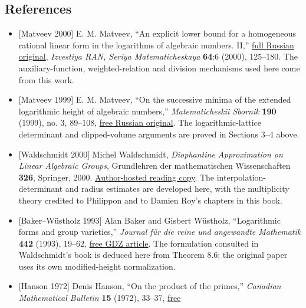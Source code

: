 \documentclass[
  11pt,
  a4paper,
]{article}
\providecommand{\tightlist}{%
  \setlength{\itemsep}{0pt}\setlength{\parskip}{0pt}}
\begin{document}
\subsection{References}\label{references}

\begin{itemize}
\tightlist
\item
  {[}Matveev 2000{]} E. M. Matveev, ``An explicit lower bound for a
  homogeneous rational linear form in the logarithms of algebraic
  numbers. II,''
  \href{https://m.mathnet.ru/php/getFT.phtml?jrnid=im&paperid=314&what=fullt&option_lang=rus}{full
  Russian original}, \emph{Izvestiya RAN, Seriya Matematicheskaya}
  \textbf{64}:6 (2000), 125--180. The auxiliary-function,
  weighted-relation and division mechanisms used here come from this
  work.
\item
  {[}Matveev 1999{]} E. M. Matveev, ``On the successive minima of the
  extended logarithmic height of algebraic numbers,''
  \emph{Matematicheskii Sbornik} \textbf{190} (1999), no. 3, 89--108,
  \href{https://m.mathnet.ru/php/getFT.phtml?jrnid=sm&option_lang=rus&paperid=394&what=fullt}{free
  Russian original}. The logarithmic-lattice determinant and
  clipped-volume arguments are proved in Sections 3--4 above.
\item
  {[}Waldschmidt 2000{]} Michel Waldschmidt, \emph{Diophantine
  Approximation on Linear Algebraic Groups}, Grundlehren der
  mathematischen Wissenschaften \textbf{326}, Springer, 2000.
  \href{https://webusers.imj-prg.fr/~michel.waldschmidt/articles/pdf/dalag.pdf}{Author-hosted
  reading copy}. The interpolation-determinant and radius estimates are
  developed here, with the multiplicity theory credited to Philippon and
  to Damien Roy's chapters in this book.
\item
  {[}Baker--Wüstholz 1993{]} Alan Baker and Gisbert Wüstholz,
  ``Logarithmic forms and group varieties,'' \emph{Journal für die reine
  und angewandte Mathematik} \textbf{442} (1993), 19--62,
  \href{https://gdz.sub.uni-goettingen.de/download/pdf/PPN243919689_0442/LOG_0005.pdf}{free
  GDZ article}. The formulation consulted in Waldschmidt's book is
  deduced here from Theorem 8.6; the original paper uses its own
  modified-height normalization.
\item
  {[}Hanson 1972{]} Denis Hanson, ``On the product of the primes,''
  \emph{Canadian Mathematical Bulletin} \textbf{15} (1972), 33--37,
  \href{https://www.cambridge.org/core/services/aop-cambridge-core/content/view/EBCBB4096EBC2A145C743C4C0E123E69/S0008439500060835a.pdf/on_the_product_of_the_primes.pdf}{free
}
\end{itemize}
\end{document}
